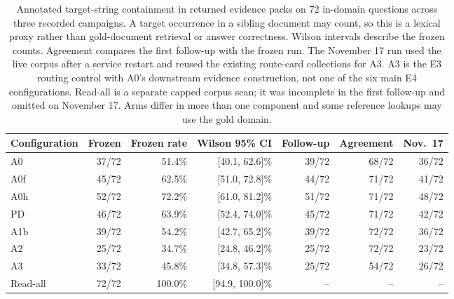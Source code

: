 \begin{table}[t]
\centering\small
\caption{Annotated target-string containment in returned evidence packs on 72
in-domain questions across three recorded campaigns. A target
occurrence in a sibling document may count, so this is a lexical proxy rather
than gold-document retrieval or answer correctness. Wilson intervals describe
the frozen counts. Agreement compares the first follow-up with the frozen
run. The November 17 run used the live corpus after a service restart and
reused the existing route-card collections for A3. A3 is the E3 routing
control with A0's downstream evidence construction, not one of the six
main E4 configurations. Read-all is a separate capped corpus scan; it was
incomplete in the first follow-up and omitted on November 17. Arms
differ in more than one component and some reference lookups may use the gold
domain.}
\label{tab:s-arm-data}
\begin{tabular}{lrrrrrr}
\toprule
Configuration & Frozen & Frozen rate & Wilson 95\% CI & Follow-up & Agreement & Nov.\ 17 \\
\midrule
A0 & 37/72 & 51.4\% & [40.1, 62.6]\% & 39/72 & 68/72 & 36/72 \\
A0f & 45/72 & 62.5\% & [51.0, 72.8]\% & 44/72 & 71/72 & 41/72 \\
A0h & 52/72 & 72.2\% & [61.0, 81.2]\% & 51/72 & 71/72 & 48/72 \\
PD & 46/72 & 63.9\% & [52.4, 74.0]\% & 45/72 & 71/72 & 42/72 \\
A1b & 39/72 & 54.2\% & [42.7, 65.2]\% & 39/72 & 72/72 & 36/72 \\
A2 & 25/72 & 34.7\% & [24.8, 46.2]\% & 25/72 & 72/72 & 23/72 \\
A3 & 33/72 & 45.8\% & [34.8, 57.3]\% & 25/72 & 54/72 & 26/72 \\
Read-all & 72/72 & 100.0\% & [94.9, 100.0]\% & -- & -- & -- \\
\bottomrule
\end{tabular}
\end{table}
